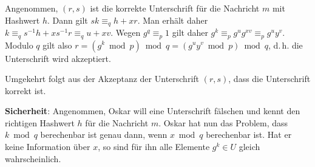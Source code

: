 \begin{Beweis}
    Angenommen, $(r, s)$ ist die korrekte Unterschrift für die Nachricht $m$
    mit Hashwert $h$.
    Dann gilt $sk \equiv_q h + xr$.
    Man erhält daher $k \equiv_q s^{-1} h + xs^{-1} r \equiv_q u + xv$.
    Wegen $g^q \equiv_p 1$ gilt daher
    $g^k \equiv_p g^u g^{xv} \equiv_p g^u y^v$.
    Modulo $q$ gilt also $r = (g^k \bmod p) \bmod q = (g^u y^v \bmod p) \bmod q$,
    d.\,h. die Unterschrift wird akzeptiert.

    Umgekehrt folgt aus der Akzeptanz der Unterschrift $(r, s)$, dass
    die Unterschrift korrekt ist.
\end{Beweis}

\linie

\textbf{Sicherheit}:
Angenommen, Oskar will eine Unterschrift fälschen und kennt den richtigen Hashwert $h$ für
die Nachricht $m$.
Oskar hat nun das Problem, dass $k \bmod q$ berechenbar ist genau dann, wenn $x \bmod q$
berechenbar ist.
Hat er keine Information über $x$, so sind für ihn alle Elemente $g^k \in U$ gleich
wahrscheinlich.

\pagebreak
{}

